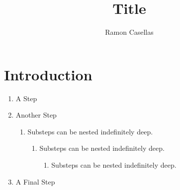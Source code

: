\documentclass[pdftex,english,a4paper,10pt]{article}
\title{Title}
\author{Ramon Casellas}
\begin{document}
\maketitle

\section{Introduction}
\label{id2720049}\hypertarget{id2720049}{}%
{}
\begin{enumerate}
\item{{ A Step }}
\item{{ Another Step \begin{enumerate}
\item{{ Substeps can be nested indefinitely deep.  \begin{enumerate}
\item{{ Substeps can be nested indefinitely deep.  \begin{enumerate}
\item{{ Substeps can be nested indefinitely deep.  }}
\end{enumerate}
}}
\end{enumerate}
}}
\end{enumerate}
}}
\item{{
    A Final Step
  }}
\end{enumerate}

\end{document}
